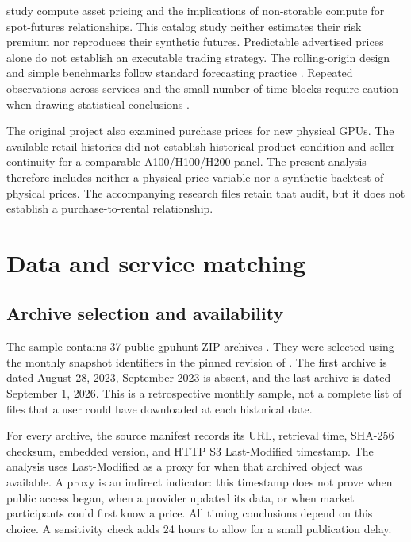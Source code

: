 \documentclass[10pt]{article}
\begin{document}
\citet{bandisu2026} study compute asset pricing and the implications of non-storable compute for spot-futures relationships. This catalog study neither estimates their risk premium nor reproduces their synthetic futures. Predictable advertised prices alone do not establish an executable trading strategy. The rolling-origin design and simple benchmarks follow standard forecasting practice \citep{hyndman2021}. Repeated observations across services and the small number of time blocks require caution when drawing statistical conclusions \citep{cameron2015}.

The original project also examined purchase prices for new physical GPUs. The available retail histories did not establish historical product condition and seller continuity for a comparable A100/H100/H200 panel. The present analysis therefore includes neither a physical-price variable nor a synthetic backtest of physical prices. The accompanying research files retain that audit, but it does not establish a purchase-to-rental relationship.

\section{Data and service matching}

\subsection{Archive selection and availability}

The sample contains 37 public gpuhunt ZIP archives \citep{gpuhunt}. They were selected using the monthly snapshot identifiers in the pinned revision of \citet{mittal2026}. The first archive is dated August 28, 2023, September 2023 is absent, and the last archive is dated September 1, 2026. This is a retrospective monthly sample, not a complete list of files that a user could have downloaded at each historical date.

For every archive, the source manifest records its URL, retrieval time, SHA-256 checksum, embedded version, and HTTP S3 Last-Modified timestamp. The analysis uses Last-Modified as a proxy for when that archived object was available. A proxy is an indirect indicator: this timestamp does not prove when public access began, when a provider updated its data, or when market participants could first know a price. All timing conclusions depend on this choice. A sensitivity check adds 24 hours to allow for a small publication delay.
\end{document}

